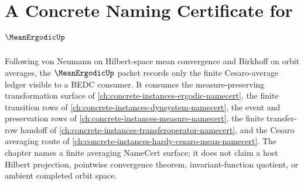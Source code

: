 \chapter{A Concrete Naming Certificate for $\MeanErgodicUp$}
\label{ch:concrete-instances-mean-ergodic-namecert}

Following von Neumann on Hilbert-space mean convergence and Birkhoff on orbit averages, the $\MeanErgodicUp$ packet records only the finite Cesaro-average ledger visible to a BEDC consumer. It consumes the measure-preserving transformation surface of \autoref{ch:concrete-instances-ergodic-namecert}, the finite transition rows of \autoref{ch:concrete-instances-dynsystem-namecert}, the event and preservation rows of \autoref{ch:concrete-instances-measure-namecert}, the finite transfer-row handoff of \autoref{ch:concrete-instances-transferoperator-namecert}, and the Cesaro averaging route of \autoref{ch:concrete-instances-hardy-cesaro-mean-namecert}. The chapter names a finite averaging NameCert surface; it does not claim a host Hilbert projection, pointwise convergence theorem, invariant-function quotient, or ambient completed orbit space.

